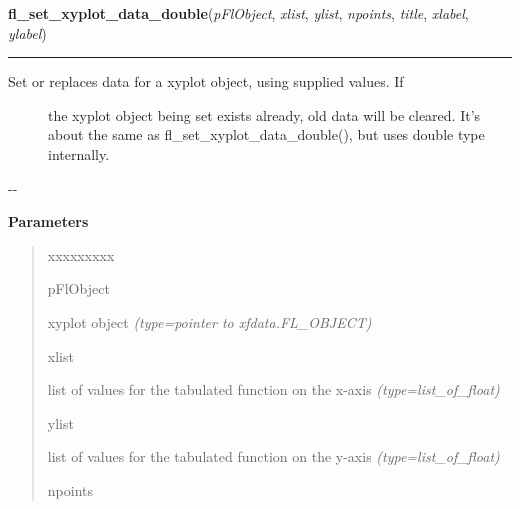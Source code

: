     \label{xformslib:flxyplot:fl_set_xyplot_data_double}

    \vspace{0.5ex}

\hspace{.8\funcindent}\begin{boxedminipage}{\funcwidth}

    \raggedright \textbf{fl\_set\_xyplot\_data\_double}(\textit{pFlObject}, \textit{xlist}, \textit{ylist}, \textit{npoints}, \textit{title}, \textit{xlabel}, \textit{ylabel})

    \vspace{-1.5ex}

    \rule{\textwidth}{0.5\fboxrule}
\setlength{\parskip}{2ex}
%
\begin{description}
\item[{Set or replaces data for a xyplot object, using supplied values. If}] \leavevmode 
the xyplot object being set exists already, old data will be cleared.
It's about the same as fl\_set\_xyplot\_data\_double(), but uses double type
internally.

\end{description}

-{}-
%
\begin{quote}

\end{quote}
\setlength{\parskip}{1ex}
      \textbf{Parameters}
      \vspace{-1ex}

      \begin{quote}
        \begin{Ventry}{xxxxxxxxx}

          \item[pFlObject]


xyplot object
            {\it (type=pointer to xfdata.FL\_OBJECT)}

          \item[xlist]


list of values for the tabulated function on the x-axis
            {\it (type=list\_of\_float)}

          \item[ylist]


list of values for the tabulated function on the y-axis
            {\it (type=list\_of\_float)}

          \item[npoints]



\end{Ventry}
\end{quote}
\end{boxedminipage}
